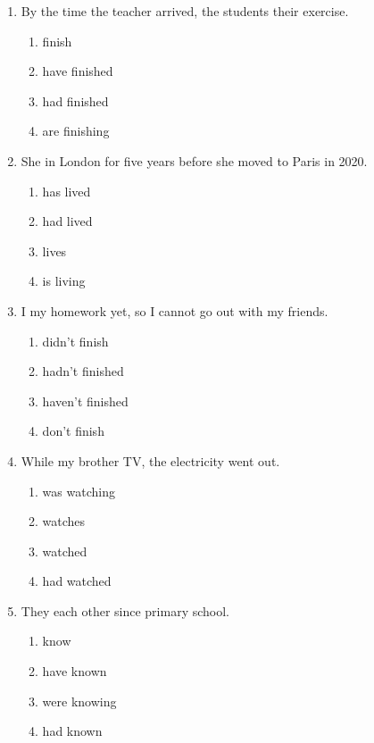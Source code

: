 \documentclass[11pt, a4paper]{article}
\begin{document}
\begin{enumerate}[leftmargin=1.8em, itemsep=10pt]

    \item By the time the teacher arrived, the students \dotfill their exercise.
    \begin{enumerate}[label=(\Alph*), itemsep=2pt]
        \item finish
        \item have finished
        \item had finished
        \item are finishing
    \end{enumerate}

    \item She \dotfill in London for five years before she moved to Paris in 2020.
    \begin{enumerate}[label=(\Alph*), itemsep=2pt]
        \item has lived
        \item had lived
        \item lives
        \item is living
    \end{enumerate}

    \item I \dotfill my homework yet, so I cannot go out with my friends.
    \begin{enumerate}[label=(\Alph*), itemsep=2pt]
        \item didn't finish
        \item hadn't finished
        \item haven't finished
        \item don't finish
    \end{enumerate}

    \item While my brother \dotfill TV, the electricity went out.
    \begin{enumerate}[label=(\Alph*), itemsep=2pt]
        \item was watching
        \item watches
        \item watched
        \item had watched
    \end{enumerate}

    \item They \dotfill each other since primary school.
    \begin{enumerate}[label=(\Alph*), itemsep=2pt]
        \item know
        \item have known
        \item were knowing
        \item had known
    \end{enumerate}


\end{enumerate}
\end{document}
